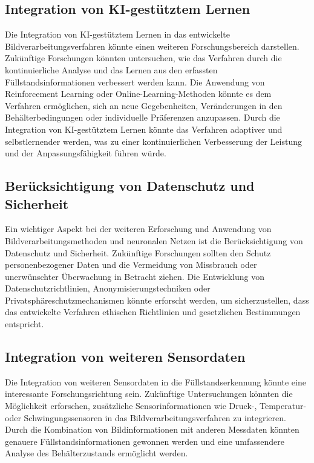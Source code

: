 \subsection{Integration von KI-gestütztem Lernen}

Die Integration von KI-gestütztem Lernen in das entwickelte Bildverarbeitungsverfahren könnte einen weiteren Forschungsbereich darstellen. Zukünftige Forschungen könnten untersuchen, wie das Verfahren durch die kontinuierliche Analyse und das Lernen aus den erfassten Füllstandsinformationen verbessert werden kann. Die Anwendung von Reinforcement Learning oder Online-Learning-Methoden könnte es dem Verfahren ermöglichen, sich an neue Gegebenheiten, Veränderungen in den Behälterbedingungen oder individuelle Präferenzen anzupassen. Durch die Integration von KI-gestütztem Lernen könnte das Verfahren adaptiver und selbstlernender werden, was zu einer kontinuierlichen Verbesserung der Leistung und der Anpassungsfähigkeit führen würde.

\subsection{Berücksichtigung von Datenschutz und Sicherheit}

Ein wichtiger Aspekt bei der weiteren Erforschung und Anwendung von Bildverarbeitungsmethoden und neuronalen Netzen ist die Berücksichtigung von Datenschutz und Sicherheit. Zukünftige Forschungen sollten den Schutz personenbezogener Daten und die Vermeidung von Missbrauch oder unerwünschter Überwachung in Betracht ziehen. Die Entwicklung von Datenschutzrichtlinien, Anonymisierungstechniken oder Privatsphäreschutzmechanismen könnte erforscht werden, um sicherzustellen, dass das entwickelte Verfahren ethischen Richtlinien und gesetzlichen Bestimmungen entspricht.

\subsection{Integration von weiteren Sensordaten}

Die Integration von weiteren Sensordaten in die Füllstandserkennung könnte eine interessante Forschungsrichtung sein. Zukünftige Untersuchungen könnten die Möglichkeit erforschen, zusätzliche Sensorinformationen wie Druck-, Temperatur- oder Schwingungssensoren in das Bildverarbeitungsverfahren zu integrieren. Durch die Kombination von Bildinformationen mit anderen Messdaten könnten genauere Füllstandsinformationen gewonnen werden und eine umfassendere Analyse des Behälterzustands ermöglicht werden.

